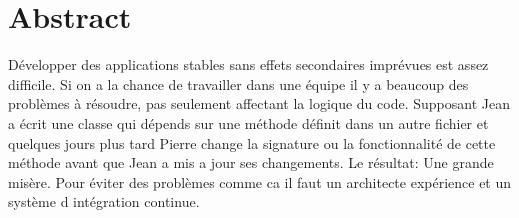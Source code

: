 \chapter*{Abstract}
\label{chap:abstract}
Développer des applications stables sans effets secondaires imprévues est assez difficile. Si on a la chance de travailler dans une équipe il y a beaucoup des problèmes à résoudre, pas seulement affectant la logique du code.
Supposant Jean a écrit une classe qui dépends sur une méthode définit dans un autre fichier et quelques jours plus tard Pierre change la signature ou la fonctionnalité de cette méthode avant que Jean a mis a jour ses changements. Le résultat: Une grande misère.
Pour éviter des problèmes comme ca il faut un architecte expérience et un système d intégration continue.